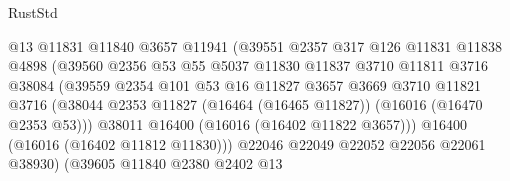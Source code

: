 \begin{lexlean}{RustStd}
\begin{coremodule}
                                    @13
                                    @11831
                                    @11840
                                    @3657
                                    @11941
                                    (@39551
                                      @2357
                                      @317
                                      @126
                                      @11831
                                      @11838
                                      @4898
                                      (@39560
                                        @2356
                                        @53
                                        @55
                                        @5037
                                        @11830
                                        @11837
                                        @3710
                                        @11811
                                        @3716
                                        @38084
                                        (@39559
                                          @2354
                                          @101
                                          @53
                                          @16
                                          @11827
                                          @3657
                                          @3669
                                          @3710
                                          @11821
                                          @3716
                                          (@38044
                                            @2353
                                            @11827
                                            (@16464 (@16465 @11827))
                                            (@16016 (@16470 @2353 @53)))
                                          @38011
                                          @16400
                                          (@16016 (@16402 @11822 @3657)))
                                        @16400
                                        (@16016 (@16402 @11812 @11830)))
                                      @22046
                                      @22049
                                      @22052
                                      @22056
                                      @22061
                                      @38930)
                                    (@39605
                                      @11840
                                      @2380
                                      @2402
                                      @13

\end{coremodule}
\end{lexlean}
